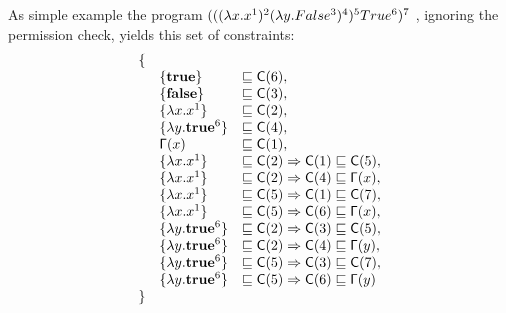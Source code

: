 As simple example the program $(((\lambda x.x^{1})^{2} (\lambda y.False^{3})^{4})^{5} True^{6})^{7}$ , ignoring the permission check, yields this set of constraints:
\[
\begin{array}{lll}
\{\\
& \{\mathbf{true}\} &\sqsubseteq \mathsf{C}(6),\\
& \{\mathbf{false}\} &\sqsubseteq \mathsf{C}(3),\\
& \{\lambda x.x^{1}\} &\sqsubseteq \mathsf{C}(2),\\
& \{\lambda y.\mathbf{true}^{6}\} &\sqsubseteq \mathsf{C}(4),\\
& \mathsf{\Gamma}(x) &\sqsubseteq \mathsf{C}(1),\\
& \{\lambda x.x^{1}\} &\sqsubseteq \mathsf{C}(2) \Rightarrow \mathsf{C}(1) \sqsubseteq \mathsf{C}(5),\\
& \{\lambda x.x^{1}\} &\sqsubseteq \mathsf{C}(2) \Rightarrow \mathsf{C}(4) \sqsubseteq \mathsf{\Gamma}(x),\\
& \{\lambda x.x^{1}\} &\sqsubseteq \mathsf{C}(5) \Rightarrow \mathsf{C}(1) \sqsubseteq \mathsf{C}(7),\\
& \{\lambda x.x^{1}\} &\sqsubseteq \mathsf{C}(5) \Rightarrow \mathsf{C}(6) \sqsubseteq \mathsf{\Gamma}(x),\\
& \{\lambda y.\mathbf{true}^{6}\} &\sqsubseteq \mathsf{C}(2) \Rightarrow \mathsf{C}(3) \sqsubseteq \mathsf{C}(5),\\
& \{\lambda y.\mathbf{true}^{6}\} &\sqsubseteq \mathsf{C}(2) \Rightarrow \mathsf{C}(4) \sqsubseteq \mathsf{\Gamma}(y),\\
& \{\lambda y.\mathbf{true}^{6}\} &\sqsubseteq \mathsf{C}(5) \Rightarrow \mathsf{C}(3) \sqsubseteq \mathsf{C}(7),\\
& \{\lambda y.\mathbf{true}^{6}\} &\sqsubseteq \mathsf{C}(5) \Rightarrow \mathsf{C}(6) \sqsubseteq \mathsf{\Gamma}(y)\\
\}
\end{array}
\]

